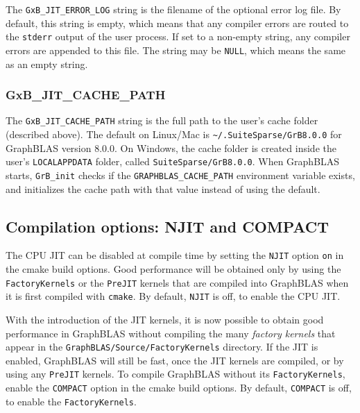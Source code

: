 \documentclass[12pt]{article}
\begin{document}
The \verb'GxB_JIT_ERROR_LOG' string is the filename of the optional error
log file.  By default, this string is empty, which means that any compiler
errors are routed to the \verb'stderr' output of the user process.  If set
to a non-empty string, any compiler errors are appended to this file.
The string may be \verb'NULL', which means the same as an empty string.

\subsubsection{\sf GxB\_JIT\_CACHE\_PATH}

The \verb'GxB_JIT_CACHE_PATH' string is the full path to the user's cache
folder (described above).  The default on Linux/Mac is
\verb'~/.SuiteSparse/GrB8.0.0' for GraphBLAS version 8.0.0.  On Windows,
the cache folder is created inside the user's \verb'LOCALAPPDATA' folder,
called \verb'SuiteSparse/GrB8.0.0'.  When GraphBLAS starts,
\verb'GrB_init' checks if the \verb'GRAPHBLAS_CACHE_PATH' environment variable
exists, and initializes the cache path with that value instead of using the
default.

\subsection{Compilation options: {\sf NJIT} and {\sf COMPACT}}

The CPU JIT can be disabled at compile time by setting the \verb'NJIT' option
\verb'on' in the cmake build options.  Good performance will be obtained only
by using the \verb'FactoryKernels' or the \verb'PreJIT' kernels that are
compiled into GraphBLAS when it is first compiled with \verb'cmake'.  By
default, \verb'NJIT' is off, to enable the CPU JIT.

With the introduction of the JIT kernels, it is now possible to obtain good
performance in GraphBLAS without compiling the many {\em factory kernels} that
appear in the \verb'GraphBLAS/Source/FactoryKernels' directory.  If the JIT is
enabled, GraphBLAS will still be fast, once the JIT kernels are compiled, or by
using any \verb'PreJIT' kernels.  To compile GraphBLAS without its
\verb'FactoryKernels', enable the \verb'COMPACT' option in the cmake build
options.  By default, \verb'COMPACT' is off, to enable the
\verb'FactoryKernels'.
\end{document}
